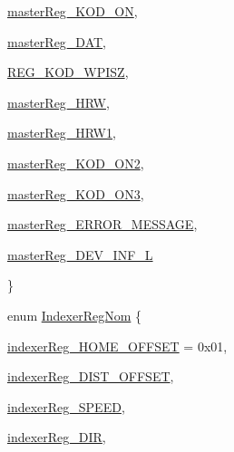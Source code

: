 \begin{DoxyCompactItemize}
\begin{DoxyCompactItemize}
\item\mbox{\hyperlink{classRegister_a109eaf7556eeb67fb1266f2c4be4477ea43587a7440df23f1fabdc236f5762777}{master\+Reg\+\_\+\+K\+O\+D\+\_\+\+ON}}, 
\item\mbox{\hyperlink{classRegister_a109eaf7556eeb67fb1266f2c4be4477ea2de56feb471732806d21bba649a6e20a}{master\+Reg\+\_\+\+D\+AT}}, 
\item\mbox{\hyperlink{classRegister_a109eaf7556eeb67fb1266f2c4be4477eae9905b2ccbbe707c8a214b157aeb7825}{R\+E\+G\+\_\+\+K\+O\+D\+\_\+\+W\+P\+I\+SZ}}, 
\item\mbox{\hyperlink{classRegister_a109eaf7556eeb67fb1266f2c4be4477ea6304355400e5df10f67ea42e12f644f5}{master\+Reg\+\_\+\+H\+RW}}, 
\item\mbox{\hyperlink{classRegister_a109eaf7556eeb67fb1266f2c4be4477ea5b8a58c6705d4d9b404bab46668c4aa9}{master\+Reg\+\_\+\+H\+R\+W1}}, 
\item\mbox{\hyperlink{classRegister_a109eaf7556eeb67fb1266f2c4be4477ea10b68d28647157a2da9acb08c22b5962}{master\+Reg\+\_\+\+K\+O\+D\+\_\+\+O\+N2}}, 
\item\mbox{\hyperlink{classRegister_a109eaf7556eeb67fb1266f2c4be4477eada2e103e37a016d2bbd3a01644c01c0c}{master\+Reg\+\_\+\+K\+O\+D\+\_\+\+O\+N3}}, 
\item\mbox{\hyperlink{classRegister_a109eaf7556eeb67fb1266f2c4be4477ea24c2d649cc95e68e1469708ca96ba048}{master\+Reg\+\_\+\+E\+R\+R\+O\+R\+\_\+\+M\+E\+S\+S\+A\+GE}}, 
\item\mbox{\hyperlink{classRegister_a109eaf7556eeb67fb1266f2c4be4477ea4ea709ceb65190fac238722937a325a4}{master\+Reg\+\_\+\+D\+E\+V\+\_\+\+I\+N\+F\+\_\+L}}
\end{DoxyCompactItemize}
 \}
\item 
enum \mbox{\hyperlink{classRegister_ad406f9442f13b42de4753bae5c705733}{Indexer\+Reg\+Nom}} \{ 
\begin{DoxyCompactItemize}
\item\mbox{\hyperlink{classRegister_ad406f9442f13b42de4753bae5c705733adb93d949f84178b150b6ba11b0dae8ed}{indexer\+Reg\+\_\+\+H\+O\+M\+E\+\_\+\+O\+F\+F\+S\+ET}} = 0x01, 
\item\mbox{\hyperlink{classRegister_ad406f9442f13b42de4753bae5c705733a0d96b0b8d4a8968234874a1392dd0ca9}{indexer\+Reg\+\_\+\+D\+I\+S\+T\+\_\+\+O\+F\+F\+S\+ET}}, 
\item\mbox{\hyperlink{classRegister_ad406f9442f13b42de4753bae5c705733a7bca99d627353c53480c00ac79f6bc79}{indexer\+Reg\+\_\+\+S\+P\+E\+ED}}, 
\item\mbox{\hyperlink{classRegister_ad406f9442f13b42de4753bae5c705733a034d44939bc2890ec2e4aa7354f8aa03}{indexer\+Reg\+\_\+\+D\+IR}}, 

\end{DoxyCompactItemize}
\end{DoxyCompactItemize}
